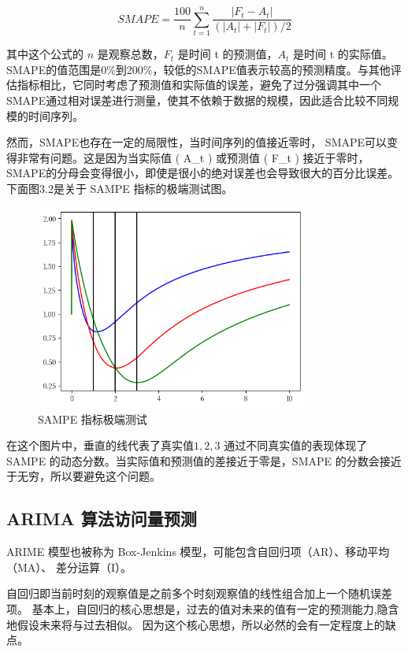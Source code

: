 \begin{equation}
  SMAPE={\frac{100}{n}}\sum_{t=1}^{n}{\frac{|F_{t}-A_{t}|}{(|A_{t}|+|F_{t}|)/2}}
\end{equation}

其中这个公式的 $n$ 是观察总数，$F_t$ 是时间 t 的预测值，$A_t$ 是时间 t 的实际值。
SMAPE的值范围是0\%到200\%，较低的SMAPE值表示较高的预测精度。与其他评估指标相比，它同时考虑了预测值和实际值的误差，避免了过分强调其中一个
SMAPE通过相对误差进行测量，使其不依赖于数据的规模，因此适合比较不同规模的时间序列。

然而，SMAPE也存在一定的局限性，当时间序列的值接近零时，
SMAPE可以变得非常有问题。这是因为当实际值 ( A\_t ) 或预测值 ( F\_t ) 接近于零时，SMAPE的分母会变得很小，即使是很小的绝对误差也会导致很大的百分比误差。下面图3.2是关于 SAMPE 指标的极端测试图。

\begin{figure}
  \centering
  \includegraphics[width=0.8\textwidth]{figures/sampe_external.png}
  \caption{SAMPE 指标极端测试}
\end{figure}

在这个图片中，垂直的线代表了真实值$1 , 2, 3$ 通过不同真实值的表现体现了 SAMPE 的动态分数。当实际值和预测值的差接近于零是，SMAPE 的分数会接近于无穷，所以要避免这个问题。

\subsection{ARIMA 算法访问量预测}

ARIME 模型也被称为 Box-Jenkins 模型，可能包含自回归项（AR）、移动平均（MA）、
差分运算（I）。

自回归即当前时刻的观察值是之前多个时刻观察值的线性组合加上一个随机误差项。
基本上，自回归的核心思想是，过去的值对未来的值有一定的预测能力,隐含地假设未来将与过去相似。
因为这个核心思想，所以必然的会有一定程度上的缺点。

